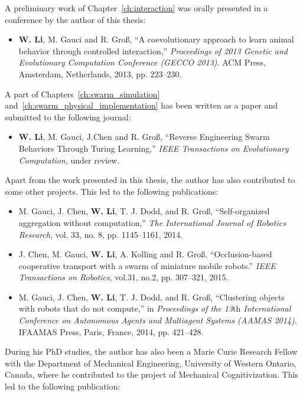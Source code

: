 A preliminary work of Chapter~\ref{ch:interaction} was orally presented in a conference by the author of this thesis:
\begin{itemize}
%
\item \textbf{W. Li}, M. Gauci and R. Gro{\ss}, ``A coevolutionary approach to learn animal behavior through controlled interaction,'' \textit{Proceedings of 2013 Genetic and Evolutionary Computation Conference (GECCO 2013)}. ACM Press, Amsterdam, Netherlands, 2013, pp. 223--230.
%
\end{itemize}

A part of Chapters~\ref{ch:swarm_simulation} and~\ref{ch:swarm_physical_implementation} has been written as a paper and submitted to the following journal:
\begin{itemize}
%
\item \textbf{W. Li}, M. Gauci, J.Chen and R. Gro{\ss}, ``Reverse Engineering Swarm Behaviors Through Turing Learning,'' \textit{IEEE Transactions on Evolutionary Computation}, under review.
%
\end{itemize}

Apart from the work presented in this thesis, the author has also contributed to some other projects. This led to the following publications:

\begin{itemize}
%
\item M. Gauci, J. Chen, \textbf{W. Li}, T. J. Dodd, and R. Gro{\ss}, ``Self-organized aggregation without computation,'' \textit{The International Journal of Robotics Research}, vol. 33, no. 8, pp. 1145--1161, 2014.
%
\item J. Chen, M. Gauci, \textbf{W. Li}, A. Kolling and R. Gro{\ss}, ``Occlusion-based cooperative transport with a swarm of miniature mobile robots.''\textit{ IEEE Transactions on Robotics}, vol.31, no.2, pp. 307--321, 2015.
%
\item M. Gauci, J. Chen, \textbf{W. Li}, T. J. Dodd, and R. Gro{\ss}, ``Clustering objects with robots that do not compute,'' in \textit{Proceedings of the 13${\textrm{th}}$ International Conference on Autonomous Agents and Multiagent Systems (AAMAS 2014)}. IFAAMAS Press, Paris, France, 2014, pp. 421--428.
%
\end{itemize}

During his PhD studies, the author has also been a Marie Curie Research Fellow with the Department of Mechanical Engineering, University of Western Ontario, Canada, where he contributed to the project of Mechanical Cognitivization. This led to the following publication:

